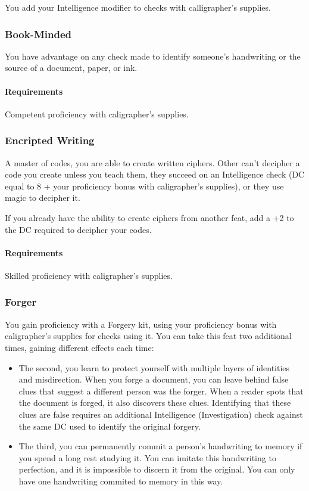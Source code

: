    You add your Intelligence modifier to checks with calligrapher's supplies.
\subsubsection{Book-Minded} \label{feat::bookminded}
    You have advantage on any check made to identify someone's handwriting or the source of a document, paper, or ink.
    \paragraph{Requirements} Competent proficiency with caligrapher's supplies.
\subsubsection{Encripted Writing} \label{feat::encriptedwriting}
    A master of codes, you are able to create written ciphers.
    Other can't decipher a code you create unless you teach them, they succeed on an Intelligence check (DC equal to 8 + your proficiency bonus with caligrapher's supplies), or they use magic to decipher it.

    If you already have the ability to create ciphers from another feat, add a +2 to the DC required to decipher your codes.
    \paragraph{Requirements} Skilled proficiency with caligrapher's supplies.
\subsubsection{Forger} \label{feat::forger}
    You gain proficiency with a Forgery kit, using your proficiency bonus with caligrapher's supplies for checks using it.
    You can take this feat two additional times, gaining different effects each time:
    \begin{itemize}
        \item The second, you learn to protect yourself with multiple layers of identities and misdirection.
        When you forge a document, you can leave behind false clues that suggest a different person was the forger.
        When a reader spots that the document is forged, it also discovers these clues.
        Identifying that these clues are false requires an additional Intelligence (Investigation) check against the same DC used to identify the original forgery.
        \item The third, you can permanently commit a person's handwriting to memory if you spend a long rest studying it.
        You can imitate this handwriting to perfection, and it is impossible to discern it from the original.
        You can only have one handwriting commited to memory in this way.
    \end{itemize}
